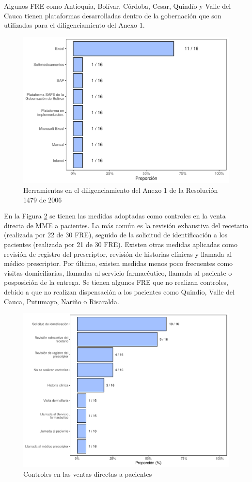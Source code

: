 \documentclass[
]{book}
\begin{document}
Algunos FRE como Antioquia, Bolívar, Córdoba, Cesar, Quindío y Valle del Cauca tienen plataformas desarrolladas dentro de la gobernación que son utilizadas para el diligenciamiento del Anexo 1.

\begin{figure}
\includegraphics[width=0.85\linewidth]{InformeFinal_files/figure-latex/HerramientasDiligA1-1} \caption{Herramientas en el diligenciamiento del Anexo 1 de la Resolución 1479 de 2006}\label{fig:HerramientasDiligA1}
\end{figure}

En la Figura \ref{fig:ControlesVentasFRE} se tienen las medidas adoptadas como controles en la venta directa de MME a pacientes. La más común es la revisión exhaustiva del recetario (realizada por 22 de 30 FRE), seguido de la solicitud de identificación a los pacientes (realizada por 21 de 30 FRE). Existen otras medidas aplicadas como revisión de registro del prescriptor, revisión de historias clínicas y llamada al médico prescriptor. Por último, existen medidas menos poco frecuentes como visitas domiciliarias, llamadas al servicio farmacéutico, llamada al paciente o posposición de la entrega. Se tienen algunos FRE que no realizan controles, debido a que no realizan dispensación a los pacientes como Quindío, Valle del Cauca, Putumayo, Nariño o Risaralda.

\begin{figure}
\includegraphics[width=0.85\linewidth]{InformeFinal_files/figure-latex/ControlesVentasFRE-1} \caption{Controles en las ventas directas a pacientes}\label{fig:ControlesVentasFRE}
\end{figure}
\end{document}
